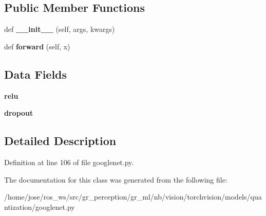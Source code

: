 \subsection*{Public Member Functions}
\begin{DoxyCompactItemize}
\item 
\mbox{\label{classtorchvision_1_1models_1_1quantization_1_1googlenet_1_1QuantizableInceptionAux_a744d2663ff2e55d1eb79fcf47bc8dd0c}} 
def {\bfseries \+\_\+\+\_\+init\+\_\+\+\_\+} (self, args, kwargs)
\item 
\mbox{\label{classtorchvision_1_1models_1_1quantization_1_1googlenet_1_1QuantizableInceptionAux_af7690337a533fc03908b7ca7eb180c3c}} 
def {\bfseries forward} (self, x)
\end{DoxyCompactItemize}
\subsection*{Data Fields}
\begin{DoxyCompactItemize}
\item 
\mbox{\label{classtorchvision_1_1models_1_1quantization_1_1googlenet_1_1QuantizableInceptionAux_a64f6e5c69ab4ddc1fcec3feddfc0d3df}} 
{\bfseries relu}
\item 
\mbox{\label{classtorchvision_1_1models_1_1quantization_1_1googlenet_1_1QuantizableInceptionAux_a3e130216c86622d4cefbda0283a762b3}} 
{\bfseries dropout}
\end{DoxyCompactItemize}


\subsection{Detailed Description}


Definition at line 106 of file googlenet.\+py.



The documentation for this class was generated from the following file\+:\begin{DoxyCompactItemize}
\item 
/home/jose/ros\+\_\+ws/src/gr\+\_\+perception/gr\+\_\+ml/nb/vision/torchvision/models/quantization/googlenet.\+py\end{DoxyCompactItemize}
